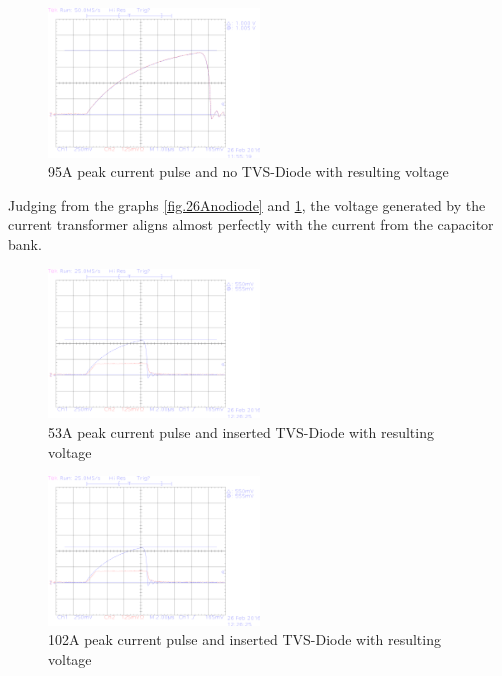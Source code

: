 \begin{figure}[!ht]
	\centering
	\includegraphics[width=0.5\textwidth]{figures/Voltage_Clamping/TEK00004.eps}		
	\caption[Kurze Abbildungsbeschreibung]{95A peak current pulse and no TVS-Diode with resulting voltage} 
	\label{fig.100Anodiode}
\end{figure}

Judging from the graphs \ref{fig.26Anodiode} and \ref{fig.100Anodiode}, the voltage generated by the current transformer aligns almost
perfectly with the current from the capacitor bank.

\begin{figure}[!ht]
	\centering
	\includegraphics[width=0.5\textwidth]{figures/Voltage_Clamping/TEK00006.eps}		
	\caption[Kurze Abbildungsbeschreibung]{53A peak current pulse and inserted TVS-Diode with resulting voltage} 
	\label{fig.53Adiode}
\end{figure}

\begin{figure}[!ht]
	\centering
	\includegraphics[width=0.5\textwidth]{figures/Voltage_Clamping/TEK00006.eps}		
	\caption[Kurze Abbildungsbeschreibung]{102A peak current pulse and inserted TVS-Diode with resulting voltage} 
	\label{fig.100Adiode}
\end{figure}

